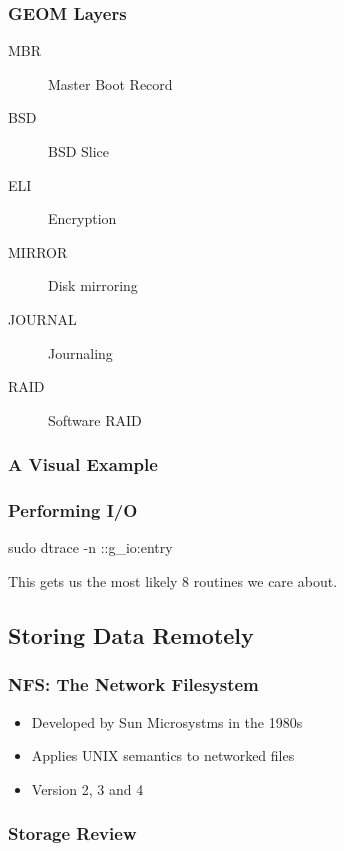 \documentclass[pdftex]{beamer} %
\begin{document}
\begin{frame}
  \frametitle{GEOM Layers}
  \begin{description}
  \item[MBR] Master Boot Record
  \item[BSD] BSD Slice
  \item[ELI] Encryption
  \item[MIRROR] Disk mirroring
  \item[JOURNAL] Journaling
  \item[RAID] Software RAID
\end{description}
\end{frame}

\begin{frame}
  \frametitle{A Visual Example}
  
\end{frame}

\begin{frame}
  \frametitle{Performing I/O}
sudo dtrace -n ::g\_io\*:entry  

This gets us the most likely 8 routines we care about.

\end{frame}

\subsection{Storing Data Remotely}
\label{sec:remote_storage}

\begin{frame}
  \frametitle{NFS: The Network Filesystem}
  \begin{itemize}
  \item Developed by Sun Microsystms in the 1980s
  \item Applies UNIX semantics to networked files
  \item Version 2, 3 and 4
  \end{itemize}
\end{frame}

\begin{frame}
  \frametitle{Storage Review}
  
\end{frame}
\end{document}
